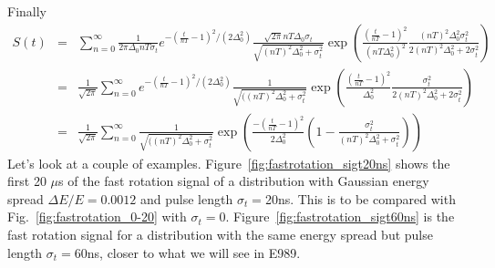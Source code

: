 \documentclass[10pt]{article}
\begin{document}
Finally
\begin{eqnarray}
S(t)&=&\sum_{n=0}^\infty\frac{1}{2\pi\Delta_0nT\sigma_t}e^{-(\frac{t}{nT}-1)^2/(2\Delta_0^2)}
\frac{\sqrt{2\pi}nT\Delta_0\sigma_t}{\sqrt{(nT)^2\Delta_0^2+\sigma_t^2}}
\exp(\frac{(\frac{t}{nT}-1)^2}{(nT\Delta_0^2)^2}\frac{(nT)^2\Delta_0^2\sigma_t^2}{2(nT)^2\Delta_0^2+2\sigma_t^2})\nonumber\\
&=& \frac{1}{\sqrt{2\pi}}\sum_{n=0}^\infty e^{-(\frac{t}{nT}-1)^2/(2\Delta_0^2)}
\frac{1}{\sqrt{((nT)^2\Delta_0^2+\sigma_t^2}}
\exp(\frac{(\frac{t}{nT}-1)^2}{\Delta_0^2}\frac{\sigma_t^2}{2(nT)^2\Delta_0^2+2\sigma_t^2})\nonumber\\
&=& \frac{1}{\sqrt{2\pi}}\sum_{n=0}^\infty
\frac{1}{\sqrt{((nT)^2\Delta_0^2+\sigma_t^2}}
\exp(\frac{-(\frac{t}{nT}-1)^2}{2\Delta_0^2}\left(1-\frac{\sigma_t^2}{(nT)^2\Delta_0^2+\sigma_t^2}\right))\label{eq:frs-sigt}
\end{eqnarray}
Let's look at a couple of examples.
Figure~\ref{fig:fastrotation_sigt20ns} shows the first 20 $\mu$s of the fast rotation signal
of a distribution with Gaussian energy spread $\Delta E/E=0.0012$ and pulse length $\sigma_t=$20ns. This is to 
be compared with Fig.~\ref{fig:fastrotation_0-20} with $\sigma_t=0$. Figure~\ref{fig:fastrotation_sigt60ns} is the fast rotation
signal for a distribution with the same energy spread but pulse length $\sigma_t=60$ns, closer to what we will see in E989. 
\end{document}
